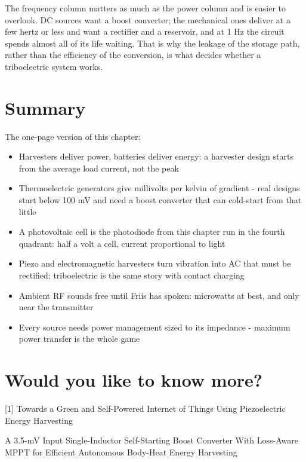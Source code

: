 The frequency column matters as much as the power column and is easier
to overlook. DC sources want a boost converter; the mechanical ones
deliver at a few hertz or less and want a rectifier and a reservoir, and
at 1 Hz the circuit spends almost all of its life waiting. That is why
the leakage of the storage path, rather than the efficiency of the
conversion, is what decides whether a triboelectric system works.

\section{Summary}\label{summary}

The one-page version of this chapter:

\begin{itemize}
\tightlist
\item
  Harvesters deliver power, batteries deliver energy: a harvester design
  starts from the average load current, not the peak
\item
  Thermoelectric generators give millivolts per kelvin of gradient -
  real designs start below 100 mV and need a boost converter that can
  cold-start from that little
\item
  A photovoltaic cell is the photodiode from this chapter run in the
  fourth quadrant: half a volt a cell, current proportional to light
\item
  Piezo and electromagnetic harvesters turn vibration into AC that must
  be rectified; triboelectric is the same story with contact charging
\item
  Ambient RF sounds free until Friis has spoken: microwatts at best, and
  only near the transmitter
\item
  Every source needs power management sized to its impedance - maximum
  power transfer is the whole game
\end{itemize}

\section{Would you like to know
more?}\label{would-you-like-to-know-more}

{[}1{]} Towards a Green and Self-Powered Internet of Things Using
Piezoelectric Energy Harvesting

A 3.5-mV Input Single-Inductor Self-Starting Boost Converter With
Loss-Aware MPPT for Efficient Autonomous Body-Heat Energy Harvesting

